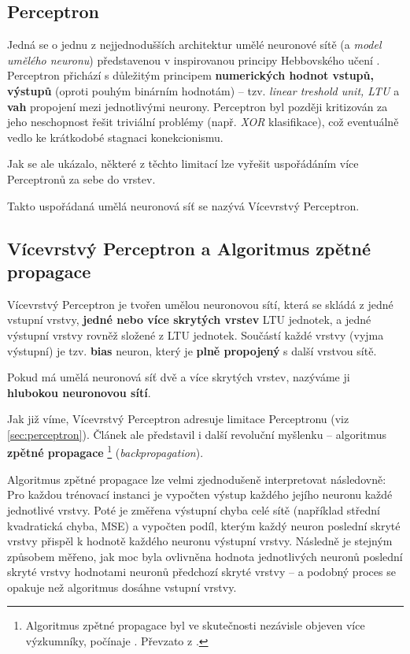 \subsection{Perceptron}
\label{sec:perceptron}
Jedná se o jednu z nejjednodušších architektur umělé neuronové sítě (a \emph{model umělého neuronu}) představenou v \cite{Rosenblatt1957} inspirovanou principy Hebbovského učení \cite{Hebb1949}.
Perceptron přichází s důležitým principem \textbf{numerických hodnot vstupů, výstupů} (oproti pouhým binárním hodnotám) – tzv. \emph{linear treshold unit, LTU} a \textbf{vah} propojení mezi jednotlivými neurony. 
Perceptron byl později kritizován \cite{Minsky1969} za jeho neschopnost řešit triviální problémy (např. \emph{XOR} klasifikace), což eventuálně vedlo ke krátkodobé stagnaci konekcionismu.

Jak se ale ukázalo, některé z těchto limitací lze vyřešit uspořádáním více Perceptronů za sebe do vrstev. \cite{Rumelhart1987}

Takto uspořádaná umělá neuronová síť se nazývá Vícevrstvý Perceptron.

\subsection{Vícevrstvý Perceptron a Algoritmus zpětné propagace}
\label{sec:multilayer_perceptron}
Vícevrstvý Perceptron je tvořen umělou neuronovou sítí, která se skládá z jedné vstupní vrstvy, \textbf{jedné nebo více skrytých vrstev} LTU jednotek, a jedné výstupní vrstvy rovněž složené z LTU jednotek.
Součástí každé vrstvy (vyjma výstupní) je tzv. \textbf{bias} neuron, který je \textbf{plně propojený} s další vrstvou sítě. \cite{Geron2019}

Pokud má umělá neuronová síť dvě a více skrytých vrstev, nazýváme ji \textbf{hlubokou neuronovou sítí}.

Jak již víme, Vícevrstvý Perceptron adresuje limitace Perceptronu (viz \autoref{sec:perceptron}).
Článek \cite{Rumelhart1987} ale představil i další revoluční myšlenku – algoritmus \textbf{zpětné propagace}
\footnote{Algoritmus zpětné propagace byl ve skutečnosti nezávisle objeven více výzkumníky, počínaje \cite{Werbos1974}. Převzato z \cite{Geron2019}.} (\emph{backpropagation}).

Algoritmus zpětné propagace lze velmi zjednodušeně interpretovat následovně: Pro každou trénovací instanci je vypočten výstup každého jejího neuronu každé jednotlivé vrstvy.
Poté je změřena výstupní chyba celé sítě (například střední kvadratická chyba, MSE) a vypočten podíl, kterým každý neuron poslední skryté vrstvy přispěl k hodnotě každého neuronu výstupní vrstvy.
Následně je stejným způsobem měřeno, jak moc byla ovlivněna hodnota jednotlivých neuronů poslední skryté vrstvy hodnotami neuronů předchozí skryté vrstvy – a podobný proces se opakuje než algoritmus dosáhne vstupní vrstvy. \cite{Geron2019}

